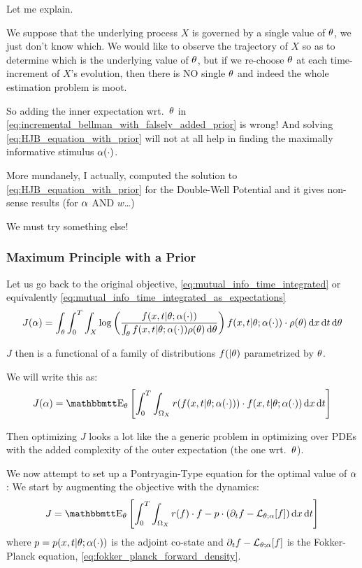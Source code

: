 Let me explain.

We suppose that the underlying process $X$ is governed by a single value of
${ \theta}$, we just don't know which. We would like to observe the
trajectory of $X$ so as to determine which is the underlying value of ${ \theta}$, but
if we re-choose ${ \theta}$ at each time-increment of $X$'s evolution, then there is
NO single ${ \theta}$ and indeed the whole estimation problem is moot.

So adding the inner expectation wrt.\ ${ \theta}$ in
\cref{eq:incremental_bellman_with_falsely_added_prior} is wrong! And solving
\cref{eq:HJB_equation_with_prior} will not at all help in finding the maximally
informative stimulus $\alpha(\cdot)$.

More mundanely, I actually, computed the solution to
\cref{eq:HJB_equation_with_prior} for the Double-Well Potential and it gives
non-sense results (for $\alpha$ AND $w$\ldots)

We must try something else!


\subsubsection{Maximum Principle with a Prior}
\label{sec:MP_with_a_prior}
Let us go back to the original objective,
\cref{eq:mutual_info_time_integrated} or equivalently
\cref{eq:mutual_info_time_integrated_as_expectations}
$$
J(\alpha)  = \int_{ \theta} \int_0^T\int_X
 \log\left(\frac{f(x,t|{ \theta} ; \alpha(\cdot) )}
 			{\int_{ \theta} f(x,t|{ \theta}; \alpha(\cdot)) \rho({ \theta})\, \mathrm{d} { \theta}}\right) 
 f(x,t|{ \theta}; \alpha(\cdot)) \cdot \rho({ \theta}) \, \mathrm{d} x\, \mathrm{d} t\, \mathrm{d} { \theta}
$$

$J$ then is a functional of a family of distributions $f(|{ \theta})$ parametrized by
${ \theta}$.

We will write this as:
$$
J(\a)  = \Exp_\th \left[ \int_0^T\int_{\O_X}
r(f(x,t|\th; \a(\cdot))) \cdot   
 f(x,t|\th; \a(\cdot)) \intd{x}\intd{t} \right]
$$ 

Then optimizing $J$ looks a lot like the a generic problem in optimizing over
PDEs with the added complexity of the outer expectation (the one wrt.\ ${ \theta}$).

We now attempt to set up a Pontryagin-Type equation for the optimal value of
$\alpha$: We start by augmenting the objective with the dynamics:
\begin{equation}
J =  \Exp_\th
\left[ \int_0^T\int_{\O_X} r(f) \cdot f - p \cdot (\di_t f - \L_{\th;\a}[f])
\intd{x}\intd{t}\right] 
\label{eq:objective_augmented}
\end{equation} 
where $p =  p(x,t|{ \theta}; \alpha(\cdot))$ is the adjoint co-state and ${\partial}_t f -
{ \mathcal{L} }_{{ \theta};\alpha}[f]$ is the Fokker-Planck equation,
\cref{eq:fokker_planck_forward_density}.

